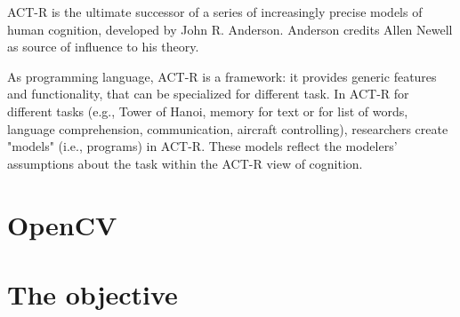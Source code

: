 ACT-R is the ultimate successor of a series of increasingly precise models of human cognition, developed by John R. Anderson. Anderson credits Allen Newell as source of influence to his theory.


As programming language, ACT-R is a framework: it provides generic features and functionality, that can be specialized for different task. In ACT-R for different tasks 
(e.g., Tower of Hanoi, memory for text or for list of words, language comprehension, 
communication, aircraft controlling), researchers create "models" (i.e., programs) in ACT-R. 
These models reflect the modelers' assumptions about the task within the ACT-R view of 
cognition.
\section{OpenCV}
\section{The objective}